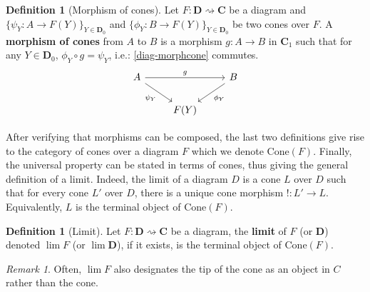 \documentclass{article}
\theoremstyle{definition}
\newtheorem{defn}[thm]{Definition}
\theoremstyle{remark}
\newtheorem{rem}[thm]{Remark}
\begin{document}
\begin{defn}[Morphism of cones]
    Let $F:\mathbf{D}\rightsquigarrow \mathbf{C}$ be a diagram and $\{\psi_Y: A \rightarrow F(Y)\}_{Y \in \mathbf{D}_0}$ and $\{\phi_Y: B\rightarrow F(Y)\}_{Y \in \mathbf{D}_0}$ be two cones over $F$. A \textbf{morphism of cones} from $A$ to $B$ is a morphism $g:A\rightarrow B$ in $\mathbf{C}_1$ such that for any $Y\in \mathbf{D}_0$, $\phi_Y \circ g = \psi_Y$, i.e.: \eqref{diag-morphcone} commutes.
    \begin{equation}\label{diag-morphcone}
        \begin{tikzcd}
            A \arrow[rr, "g"] \arrow[rd, "\psi_Y"'] &  & B \arrow[ld, "\phi_Y"] \\
             & F(Y) & 
        \end{tikzcd}
    \end{equation}
\end{defn}
After verifying that morphisms can be composed, the last two definitions give rise to the category of cones over a diagram $F$ which we denote $\text{Cone}(F)$. Finally, the universal property can be stated in terms of cones, thus giving the general definition of a limit. Indeed, the limit of a diagram $D$ is a cone $L$ over $D$ such that for every cone $L'$ over $D$, there is a unique cone morphism $!:L'\rightarrow L$. Equivalently, $L$ is the terminal object of $\text{Cone}(F)$.
\begin{defn}[Limit]
    Let $F:\mathbf{D} \rightsquigarrow \mathbf{C}$ be a diagram, the \textbf{limit} of $F$ (or $\mathbf{D}$) denoted $\lim F$ (or $\lim \mathbf{D}$), if it exists, is the terminal object of $\text{Cone}(F)$.
\end{defn}
\begin{rem}
    Often, $\lim F$ also designates the tip of the cone as an object in $C$ rather than the cone.
\end{rem}
\end{document}
